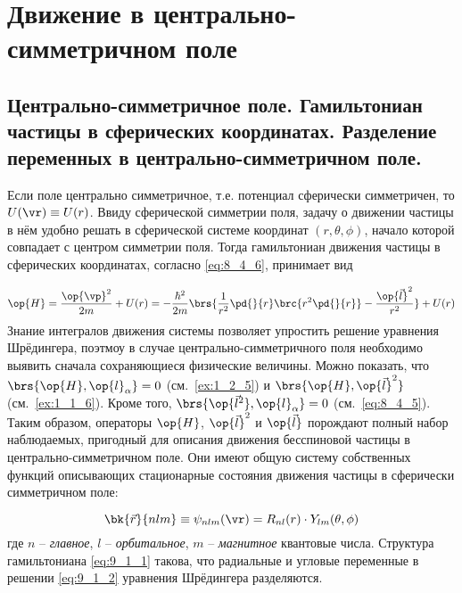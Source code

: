 \chapter{Движение в центрально-симметричном поле}

\begin{sloppypar}
\section{Центрально-симметричное поле. Гамильтониан частицы в сферических координатах. Разделение переменных в центрально-симметричном поле.}
\end{sloppypar}

Если поле центрально симметричное, т.е. потенциал сферически симметричен, то $U(\vr) \equiv U(r)$. Ввиду сферической симметрии поля, задачу о движении частицы в нём удобно решать в сферической системе координат $(r, \theta, \phi)$, начало которой совпадает с центром симметрии поля. Тогда гамильтониан движения частицы в сферических координатах, согласно \eqref{eq:8_4_6}, принимает вид

\begin{equation}
\label{eq:9_1_1}
\op{H} = \frac{\op{\vp}^2}{2m} + U(r) = - \frac{\hbar^2}{2m} \brs{\frac{1}{r^2} \pd{}{r} \brc{r^2 \pd{}{r}} - \frac{\op{\vec{l}}^2}{r^2}} + U(r)
\end{equation}%
%
Знание интегралов движения системы позволяет упростить решение уравнения Шрёдингера, поэтмоу в случае центрально-симметричного поля необходимо выявить сначала сохраняющиеся физические величины. Можно показать, что $\brs{\op{H}, \op{l}_\alpha} = 0$ (см.~\cref{ex:1_2_5}) и $\brs{\op{H}, \op{\vec{l}}^2}$ (см.~\cref{ex:1_1_6}). Кроме того, $\brs{\op{\vec{l}^2}, \op{l}_\alpha} = 0$ (см.~\eqref{eq:8_4_5}). Таким образом, операторы $\op{H}$, $\op{\vec{l}}^2$ и $\op{\vec{l}}$ порождают полный набор наблюдаемых, пригодный для описания движения бесспиновой частицы в центрально-симметричном поле. Они имеют общую систему собственных функций описывающих стационарные состояния движения частицы в сферически симметричном поле:

\begin{equation}
\label{eq:9_1_2}
\bk{\vec{r}}{nlm} \equiv \psi_{nlm}(\vr) = R_{nl}(r) \cdot Y_{lm}(\theta, \phi)
\end{equation}%
%
где $n$ -- {\em главное}, $l$ -- {\em орбитальное}, $m$ -- {\em магнитное} квантовые числа. Структура гамильтониана \eqref{eq:9_1_1} такова, что радиальные и угловые переменные в решении \eqref{eq:9_1_2} уравнения Шрёдингера разделяются.

